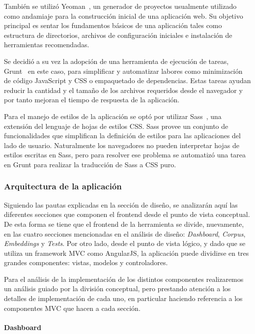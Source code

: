 También se utilizó Yeoman~\cite{Yeoman}, un generador de proyectos usualmente utilizado como andamiaje
para la construcción inicial de una aplicación web. Su objetivo principal es sentar los fundamentos básicos
de una aplicación tales como estructura de directorios, archivos de configuración iniciales e instalación
de herramientas recomendadas.

Se decidió a su vez la adopción de una herramienta de ejecución de tareas, Grunt~\cite{Grunt} en este caso,
para simplificar y automatizar labores como minimización de código JavaScript y CSS o empaquetado de
dependencias. Estas tareas ayudan reducir la cantidad y el tamaño de los archivos requeridos desde el
navegador y por tanto mejoran el tiempo de respuesta de la aplicación.

Para el manejo de estilos de la aplicación se optó por utilizar Sass~\cite{Sass}, una extensión del lenguaje
de hojas de estilos CSS. Sass provee un conjunto de funcionalidades que simplifican la definición de
estilos para las aplicaciones del lado de usuario. Naturalmente los navegadores no pueden interpretar
hojas de estilos escritas en Sass, pero para resolver ese problema se automatizó una tarea en Grunt para
realizar la traducción de Sass a CSS puro.

\subsubsection{Arquitectura de la aplicación}

Siguiendo las pautas explicadas en la sección de diseño, se analizarán aquí las diferentes secciones que
componen el frontend desde el punto de vista conceptual. De esta forma se tiene que el frontend de la
herramienta se divide, nuevamente, en las cuatro secciones mencionadas en el análisis de diseño:
\textit{Dashboard}, \textit{Corpus}, \textit{Embeddings} y \textit{Tests}. Por otro lado, desde el punto
de vista lógico, y dado que se utiliza un framework MVC como AngularJS, la aplicación puede dividirse en
tres grandes componentes: vistas, modelos y controladores.

Para el análisis de la implementación de los distintos componentes realizaremos un análisis guiado por la
división conceptual, pero prestando atención a los detalles de implementación de cada uno, en
particular haciendo referencia a los componentes MVC que hacen a cada sección.

\paragraph{Dashboard}

